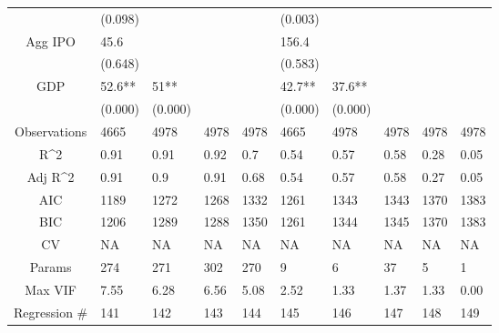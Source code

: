 \documentclass{article}
\begin{document}
\begin{table}[H]
\begin{tabular}{|clllllllll|}
   & (0.098) &  &  &  & (0.003) &  &  &  &  \\
  Agg IPO & 45.6 &  &  &  & 156.4 &  &  &  &  \\
   & (0.648) &  &  &  & (0.583) &  &  &  &  \\
  GDP & 52.6** & 51** &  &  & 42.7** & 37.6** &  &  &  \\
   & (0.000) & (0.000) &  &  & (0.000) & (0.000) &  &  &  \\
  \hline
 Observations & 4665 & 4978 & 4978 & 4978 & 4665 & 4978 & 4978 & 4978 & 4978 \\
  R^2 & 0.91 & 0.91 & 0.92 & 0.7 & 0.54 & 0.57 & 0.58 & 0.28 & 0.05 \\
  Adj R^2 & 0.91 & 0.9 & 0.91 & 0.68 & 0.54 & 0.57 & 0.58 & 0.27 & 0.05 \\
  AIC & 1189 & 1272 & 1268 & 1332 & 1261 & 1343 & 1343 & 1370 & 1383 \\
  BIC & 1206 & 1289 & 1288 & 1350 & 1261 & 1344 & 1345 & 1370 & 1383 \\
  CV & NA & NA & NA & NA & NA & NA & NA & NA & NA \\
  Params & 274 & 271 & 302 & 270 & 9 & 6 & 37 & 5 & 1 \\
  Max VIF & 7.55 & 6.28 & 6.56 & 5.08 & 2.52 & 1.33 & 1.37 & 1.33 & 0.00 \\
  Regression \# & 141 & 142 & 143 & 144 & 145 & 146 & 147 & 148 & 149 \\
   \hline
\end{tabular}

\end{table}
\end{document}
